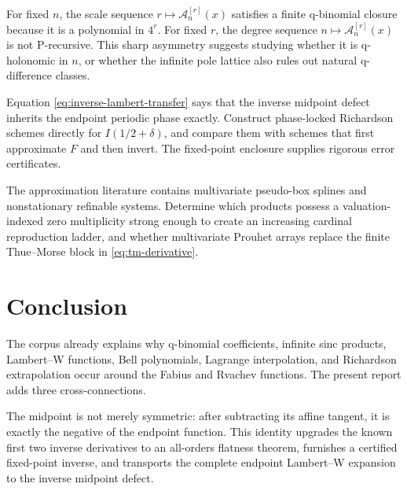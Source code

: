 \documentclass[11pt,oneside]{article}
\theoremstyle{definition}
\theoremstyle{remark}
\newcommand{\Acard}{\mathcal A}
\begin{document}
\begin{frontieropenbox}[title=6. q-holonomic versus P-recursive scale sequences]
For fixed $n$, the scale sequence $r\mapsto\Acard_n^{[r]}(x)$ satisfies a finite q-binomial closure because it is a polynomial in $4^r$.  For fixed $r$, the degree sequence $n\mapsto\Acard_n^{[r]}(x)$ is not P-recursive.  This sharp asymmetry suggests studying whether it is q-holonomic in $n$, or whether the infinite pole lattice also rules out natural q-difference classes.
\end{frontieropenbox}

\begin{frontieropenbox}[title=7. Phase-resolved inverse extrapolation]
Equation \eqref{eq:inverse-lambert-transfer} says that the inverse midpoint defect inherits the endpoint periodic phase exactly.  Construct phase-locked Richardson schemes directly for $I(1/2+\delta)$, and compare them with schemes that first approximate $F$ and then invert.  The fixed-point enclosure supplies rigorous error certificates.
\end{frontieropenbox}

\begin{frontieropenbox}[title=8. Multivariate pseudo-box analogues]
The approximation literature contains multivariate pseudo-box splines and nonstationary refinable systems.  Determine which products possess a valuation-indexed zero multiplicity strong enough to create an increasing cardinal reproduction ladder, and whether multivariate Prouhet arrays replace the finite Thue--Morse block in \eqref{eq:tm-derivative}.
\end{frontieropenbox}

\section{Conclusion}
The corpus already explains why q-binomial coefficients, infinite sinc products, Lambert--W functions, Bell polynomials, Lagrange interpolation, and Richardson extrapolation occur around the Fabius and Rvachev functions.  The present report adds three cross-connections.

The midpoint is not merely symmetric: after subtracting its affine tangent, it is exactly the negative of the endpoint function.  This identity upgrades the known first two inverse derivatives to an all-orders flatness theorem, furnishes a certified fixed-point inverse, and transports the complete endpoint Lambert--W expansion to the inverse midpoint defect.
\end{document}
